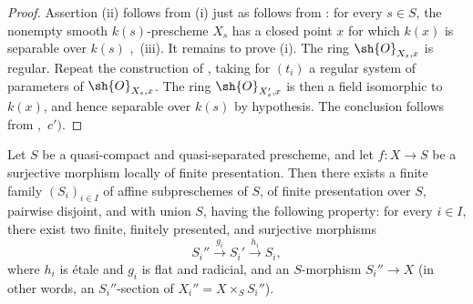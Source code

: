 \begin{proof}
Assertion (ii) follows from (i) just as  follows from : for every $s\in S$, the nonempty smooth $k(s)$-prescheme $X_s$ has a closed point $x$ for which $k(x)$ is separable over $k(s)$ ,~(iii).  It remains to prove (i).  The ring $\sh{O}_{X_s,x}$ is regular.  Repeat the construction of , taking for $(t_i)$ a regular system of parameters of $\sh{O}_{X_s,x}$.  The ring $\sh{O}_{X'_s,x}$ is then a field isomorphic to $k(x)$, and hence separable over $k(s)$ by hypothesis.  The conclusion follows from ,~$c')$.
\end{proof}

\begin{proposition}[17.16.4]
\label{IV.17.16.4}
Let $S$ be a quasi-compact and quasi-separated prescheme, and let $f:X\to S$ be a surjective morphism locally of finite presentation.  Then there exists a finite family $(S_i)_{i\in I}$ of affine subpreschemes of $S$, of finite presentation over $S$, pairwise disjoint, and with union $S$, having the following property: for every $i\in I$, there exist two finite, finitely presented, and surjective morphisms
\[
 S_i''\xrightarrow{g_i}S_i'\xrightarrow{h_i}S_i,
\]
where $h_i$ is \'etale and $g_i$ is flat and radicial, and an $S$-morphism $S_i''\to X$ (in other words, an $S_i''$-section of $X_i''=X\times_SS_i''$).
\end{proposition}


